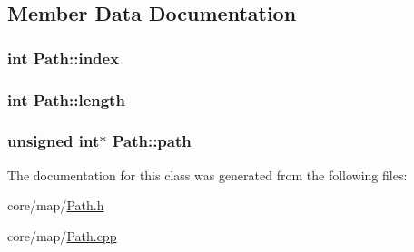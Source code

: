 \subsection{Member Data Documentation}
\hypertarget{classPath_a2519662bb0102f3b02af7a739d55add7}{
\subsubsection[{index}]{\setlength{\rightskip}{0pt plus 5cm}int Path\-::index}}\label{classPath_a2519662bb0102f3b02af7a739d55add7}
\hypertarget{classPath_a899a5337cfcdac6fb6ff020dd7b4cf7d}{
\subsubsection[{length}]{\setlength{\rightskip}{0pt plus 5cm}int Path\-::length}}\label{classPath_a899a5337cfcdac6fb6ff020dd7b4cf7d}
\hypertarget{classPath_a15e858fcafd08883c9aa4460e9a63961}{
\subsubsection[{path}]{\setlength{\rightskip}{0pt plus 5cm}unsigned int$\ast$ Path\-::path}}\label{classPath_a15e858fcafd08883c9aa4460e9a63961}


The documentation for this class was generated from the following files\-:\begin{DoxyCompactItemize}
\item 
core/map/\hyperlink{Path_8h}{Path.\-h}\item 
core/map/\hyperlink{Path_8cpp}{Path.\-cpp}\end{DoxyCompactItemize}
